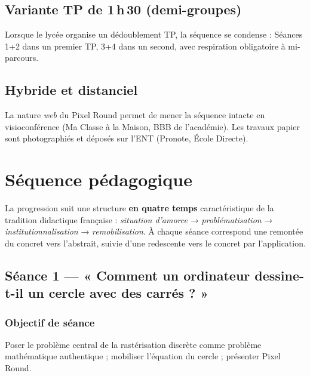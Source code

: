 \documentclass[12pt,a4paper]{scrartcl}
\newcommand{\acc}[1]{\textcolor{accent}{\textbf{#1}}}
\begin{document}
\subsection{Variante TP de 1\,h\,30 (demi-groupes)}
Lorsque le lycée organise un dédoublement TP, la séquence se condense : Séances 1+2 dans un premier TP, 3+4 dans un second, avec respiration obligatoire à mi-parcours.

\subsection{Hybride et distanciel}
La nature \emph{web} du Pixel Round permet de mener la séquence intacte en visioconférence (Ma Classe à la Maison, BBB de l'académie). Les travaux papier sont photographiés et déposés sur l'ENT (Pronote, École Directe).

\section{Séquence pédagogique}

La progression suit une structure \acc{en quatre temps} caractéristique de la tradition didactique française : \emph{situation d'amorce} → \emph{problématisation} → \emph{institutionnalisation} → \emph{remobilisation}. À chaque séance correspond une remontée du concret vers l'abstrait, suivie d'une redescente vers le concret par l'application.

\subsection{Séance 1 --- « Comment un ordinateur dessine-t-il un cercle avec des carrés ? »}\label{seance1}

\subsubsection*{Objectif de séance}
Poser le problème central de la rastérisation discrète comme problème mathématique authentique ; mobiliser l'équation du cercle ; présenter Pixel Round.

\medskip
\end{document}
